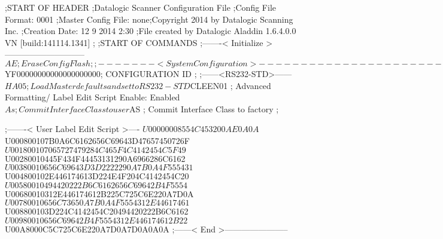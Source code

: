 ;START OF HEADER
;Datalogic Scanner Configuration File
;Config File Format: 0001
;Master Config File: none;Copyright 2014 by Datalogic Scanning Inc.
;Creation Date: 12 9 2014 2:30
;File created by Datalogic Aladdin 1.6.4.0.0 VN [build:141114.1341]
;
;START OF COMMANDS
;-------< Initialize >-----------------------------
$AE                 ; Erase Config Flash
;
;-------< System Configuration >-------------------------------
$YF00000000000000000000; CONFIGURATION ID
;
;------<RS232-STD>------
$HA05               ; Load Master defaults and set to RS232-STD
$CLEEN01            ; Advanced Formatting/ Label Edit Script Enable: Enabled
$As                 ; Commit Interface Class to user
$AS                 ; Commit Interface Class to factory
;

;-------< User Label Edit Script >----
$U00000008554C453200AE0A0A
$U000800107B0A6C6162656C69643D47657450726F
$U001800107065727479284C465F4C4142454C5F49
$U00280010445F434F44453131290A6966286C6162
$U00380010656C69643D3D2222290A7B0A4F555431
$U004800102E446174613D224E4F204C4142454C20
$U00580010494420222B6C6162656C69642B4F5554
$U00680010312E446174612B225C725C6E220A7D0A
$U00780010656C73650A7B0A4F5554312E44617461
$U008800103D224C4142454C20494420222B6C6162
$U00980010656C69642B4F5554312E446174612B22
$U00A8000C5C725C6E220A7D0A7D0A0A0A
;------< End >-----------------------
